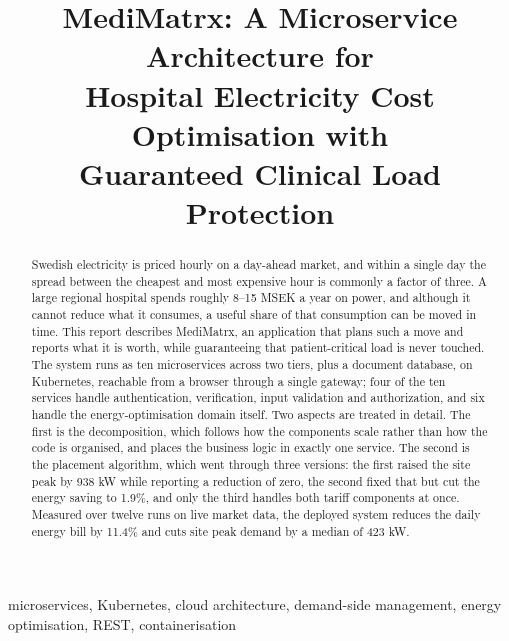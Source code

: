 \documentclass[conference]{IEEEtran}
\begin{document}
\title{MediMatrx: A Microservice Architecture for\\
Hospital Electricity Cost Optimisation with\\
Guaranteed Clinical Load Protection}

\author{
}

\maketitle

\begin{abstract}
Swedish electricity is priced hourly on a day-ahead market, and within a single
day the spread between the cheapest and most expensive hour is commonly a factor
of three. A large regional hospital spends roughly 8--15 MSEK a year on power,
and although it cannot reduce what it consumes, a useful share of that
consumption can be moved in time. This report describes MediMatrx, an
application that plans such a move and reports what it is worth, while
guaranteeing that patient-critical load is never touched. The system runs as ten
microservices across two tiers, plus a document database, on Kubernetes,
reachable from a browser through a single gateway; four of the ten services
handle authentication, verification, input validation and authorization, and
six handle the energy-optimisation domain itself. Two aspects are treated in
detail. The first is the decomposition, which follows how the components scale
rather than how the code is organised, and places the business logic in exactly
one service. The second is the placement algorithm, which went through three
versions: the first raised the site peak by 938 kW while reporting a reduction
of zero, the second fixed that but cut the energy saving to 1.9\%, and only the
third handles both tariff components at once. Measured over twelve runs on live
market data, the deployed system reduces the daily energy bill by 11.4\% and
cuts site peak demand by a median of 423 kW.
\end{abstract}

\begin{IEEEkeywords}
microservices, Kubernetes, cloud architecture, demand-side management, energy
optimisation, REST, containerisation
\end{IEEEkeywords}
\end{document}
